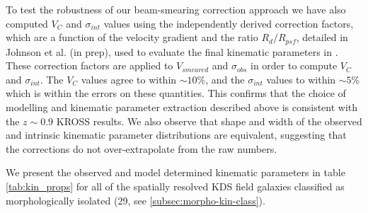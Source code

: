 \documentclass[fleqn,usenatbib]{mn2e}
\begin{document}
To test the robustness of our beam-smearing correction approach we have also computed $V_{C}$ and $\sigma_{int}$ values using the independently derived correction factors, which are a function of the velocity gradient and the ratio $R_{d}/R_{psf}$, detailed in Johnson et al. (in prep), used to evaluate the final kinematic parameters in \cite{Harrison2017}.
These correction factors are applied to $V_{smeared}$ and $\sigma_{obs}$ in order to compute $V_{C}$ and $\sigma_{int}$.
The $V_{C}$ values agree to within $\sim10\%$, and the $\sigma_{int}$ values to within $\sim5\%$ which is within the errors on these quantities. 
This confirms that the choice of modelling and kinematic parameter extraction described above is consistent with the $z\sim0.9$ KROSS results.
We also observe that shape and width of the observed and intrinsic kinematic parameter distributions are equivalent, suggesting that the corrections do not over-extrapolate from the raw numbers.

We present the observed and model determined kinematic parameters in table \ref{tab:kin_props} for all of the spatially resolved KDS field galaxies classified as morphologically isolated (29, see \cref{subsec:morpho-kin-class}).
\end{document}
